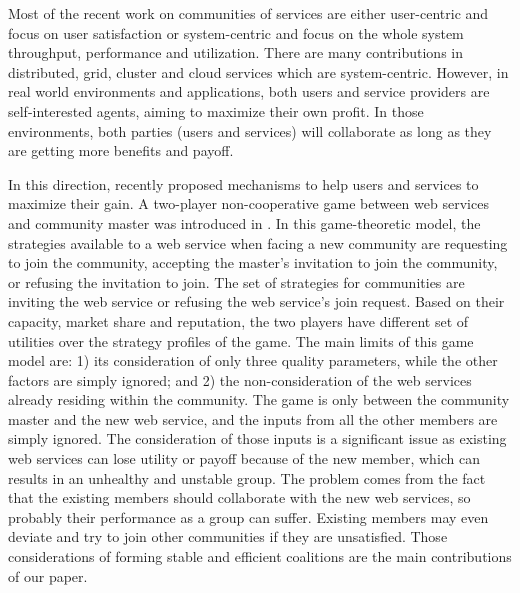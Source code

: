 Most of the recent work on communities of services are either
user-centric and focus on user satisfaction
\cite{Chun02user-centricperformance} or system-centric and focus
on the whole system throughput, performance and utilization. There
are many contributions in distributed, grid, cluster and cloud
services which are system-centric. However, in real world
environments and applications, both users and service providers
are self-interested agents, aiming to maximize their own profit.
In those environments, both parties (users and services) will
collaborate as long as they are getting more benefits and payoff.

In this direction, recently \cite{DBLP:conf/IEEEscc/LimTMB12,
DBLP:conf/IEEEscc/KhosravifarABT11, 10.1109/TSC.2012.12} proposed mechanisms to help
users and services to maximize their gain. A two-player
non-cooperative game between web services and community master was
introduced in \cite{DBLP:conf/IEEEscc/KhosravifarABT11}. In this
game-theoretic model, the strategies available to a web service
when facing a new community are requesting to join the community,
accepting the master's invitation to join the community, or
refusing the invitation to join. The set of strategies for
communities are inviting the web service or refusing the web
service's join request. Based on their capacity, market share and
reputation, the two players have different set of utilities over
the strategy profiles of the game. The main limits of this game
model are: 1) its consideration of only three quality parameters,
while the other factors are simply ignored; and 2) the
non-consideration of the web services already residing within the
community. The game is only between the community master and the
new web service, and the inputs from all the other members are
simply ignored. The consideration of those inputs is a significant
issue as existing web services can lose utility or payoff because
of the new member, which can results in an unhealthy and unstable
group. The problem comes from the fact that the existing members
should collaborate with the new web services, so probably their
performance as a group can suffer. Existing members may even
deviate and try to join other communities if they are unsatisfied.
Those considerations of forming stable and efficient coalitions
are the main contributions of our paper.

